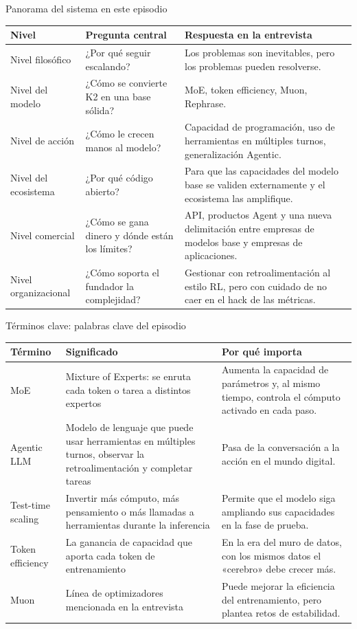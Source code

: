\documentclass[a4paper]{article}
\begin{document}
\begin{knowledgebox}{Panorama del sistema en este episodio}
\begin{tabularx}{\textwidth}{p{}p{}X}
\toprule
Nivel & Pregunta central & Respuesta en la entrevista \\
\midrule
Nivel filosófico & ¿Por qué seguir escalando? & Los problemas son inevitables, pero los problemas pueden resolverse. \\
Nivel del modelo & ¿Cómo se convierte K2 en una base sólida? & MoE, token efficiency, Muon, Rephrase. \\
Nivel de acción & ¿Cómo le crecen manos al modelo? & Capacidad de programación, uso de herramientas en múltiples turnos, generalización Agentic. \\
Nivel del ecosistema & ¿Por qué código abierto? & Para que las capacidades del modelo base se validen externamente y el ecosistema las amplifique. \\
Nivel comercial & ¿Cómo se gana dinero y dónde están los límites? & API, productos Agent y una nueva delimitación entre empresas de modelos base y empresas de aplicaciones. \\
Nivel organizacional & ¿Cómo soporta el fundador la complejidad? & Gestionar con retroalimentación al estilo RL, pero con cuidado de no caer en el hack de las métricas. \\
\bottomrule
\end{tabularx}
\end{knowledgebox}

\begin{knowledgebox}{Términos clave: palabras clave del episodio}
\begin{tabularx}{\textwidth}{p{}p{}X}
\toprule
Término & Significado & Por qué importa \\
\midrule
MoE & Mixture of Experts: se enruta cada token o tarea a distintos expertos & Aumenta la capacidad de parámetros y, al mismo tiempo, controla el cómputo activado en cada paso. \\
Agentic LLM & Modelo de lenguaje que puede usar herramientas en múltiples turnos, observar la retroalimentación y completar tareas & Pasa de la conversación a la acción en el mundo digital. \\
Test-time scaling & Invertir más cómputo, más pensamiento o más llamadas a herramientas durante la inferencia & Permite que el modelo siga ampliando sus capacidades en la fase de prueba. \\
Token efficiency & La ganancia de capacidad que aporta cada token de entrenamiento & En la era del muro de datos, con los mismos datos el «cerebro» debe crecer más. \\
Muon & Línea de optimizadores mencionada en la entrevista & Puede mejorar la eficiencia del entrenamiento, pero plantea retos de estabilidad. \\
\bottomrule
\end{tabularx}
\end{knowledgebox}
\end{document}
